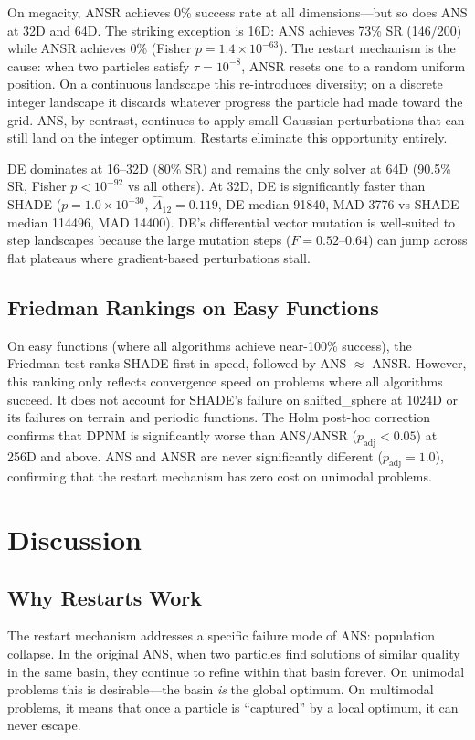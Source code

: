 \documentclass[11pt,a4paper]{article}
\begin{document}
On megacity, ANSR achieves 0\% success rate at all dimensions---but so does ANS at 32D and 64D. The striking exception is 16D: ANS achieves 73\% SR (146/200) while ANSR achieves 0\% (Fisher $p = 1.4\times10^{-63}$). The restart mechanism is the cause: when two particles satisfy $\tau = 10^{-8}$, ANSR resets one to a random uniform position. On a continuous landscape this re-introduces diversity; on a discrete integer landscape it discards whatever progress the particle had made toward the grid. ANS, by contrast, continues to apply small Gaussian perturbations that can still land on the integer optimum. Restarts eliminate this opportunity entirely.

DE dominates at 16--32D (80\% SR) and remains the only solver at 64D (90.5\% SR, Fisher $p < 10^{-92}$ vs all others). At 32D, DE is significantly faster than SHADE ($p = 1.0 \times 10^{-30}$, $\hat{A}_{12} = 0.119$, DE median 91840, MAD 3776 vs SHADE median 114496, MAD 14400). DE's differential vector mutation is well-suited to step landscapes because the large mutation steps ($F = 0.52$--$0.64$) can jump across flat plateaus where gradient-based perturbations stall.

\subsection{Friedman Rankings on Easy Functions}

On easy functions (where all algorithms achieve near-100\% success), the Friedman test ranks SHADE first in speed, followed by ANS $\approx$ ANSR. However, this ranking only reflects convergence speed on problems where all algorithms succeed. It does not account for SHADE's failure on shifted\_sphere at 1024D or its failures on terrain and periodic functions. The Holm post-hoc correction confirms that DPNM is significantly worse than ANS/ANSR ($p_{\text{adj}} < 0.05$) at 256D and above. ANS and ANSR are never significantly different ($p_{\text{adj}} = 1.0$), confirming that the restart mechanism has zero cost on unimodal problems.

\section{Discussion}

\subsection{Why Restarts Work}

The restart mechanism addresses a specific failure mode of ANS: population collapse. In the original ANS, when two particles find solutions of similar quality in the same basin, they continue to refine within that basin forever. On unimodal problems this is desirable---the basin \emph{is} the global optimum. On multimodal problems, it means that once a particle is ``captured'' by a local optimum, it can never escape.
\end{document}

